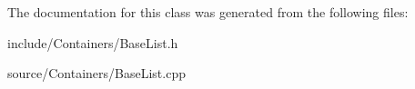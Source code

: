 The documentation for this class was generated from the following files\+:\begin{DoxyCompactItemize}
\item 
include/\+Containers/Base\+List.\+h\item 
source/\+Containers/Base\+List.\+cpp\end{DoxyCompactItemize}
